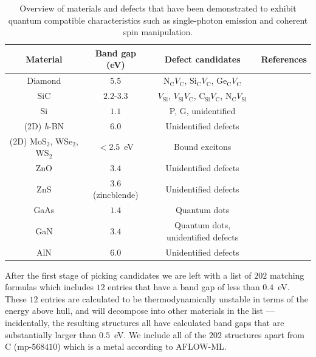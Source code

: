 \documentclass[superscriptaddress,unsortedaddress,
 amsmath,amssymb,
 aps,
]{revtex4-2}
\begin{document}
\begin{table}[b]
    \centering 
    \caption{Overview of materials and defects that have been demonstrated to exhibit quantum  compatible characteristics such as single-photon emission and coherent spin manipulation.}
    \begin{tabular}{c|c|c|c}
    Material & Band gap (eV) & Defect candidates & References \\
    \hline
    Diamond  & $5.5$  & N$_\mathrm{C}V_\mathrm{C}$, Si$_\mathrm{C}V_\mathrm{C}$, Ge$_\mathrm{C}V_\mathrm{C}$ & \cite{Taylor2008,Balasubramanian_2009,Barclay2011,Gordon2013,Rogers_2014,Bhaskar_2018} \\ 
    SiC & $2.2$-$3.3$ & $V_\mathrm{Si}$, $V_\mathrm{Si}V_\mathrm{C}$, C$_\mathrm{Si}V_\mathrm{C}$, N$_\mathrm{C}V_\mathrm{Si}$ & \cite{Widmann2014,Christle_2015,Castelletto_2014,Zargaleh_2018}  \cite{Weber2010, Son2020, Falk2013} \\ 
    Si & $1.1$ & P, G, unidentified & \cite{Muhonen_2014,Durand_2020,Redjem2020} \\ 
    (2D) \textit{h}-BN & $6.0$ & Unidentified defects & \cite{Tran_2016,Tran_2016b,Hayee_2020} \\ 
    (2D) MoS$_2$, WSe$_2$, WS$_2$ & $<2.5$~eV & Bound excitons & \cite{Toth2019} \\
    ZnO & $3.4$ & Unidentified defects & \cite{Morfa2012} \\ 
    ZnS & $3.6$ (zincblende) & Unidentified defects & \cite{Stewart2019} \\ 
    GaAs & $1.4$ & Quantum dots & \cite{Bluhm2010} \\ 
    GaN & $3.4$ & Quantum dots, unidentified defects & \cite{Roux2017,Berhane2018} \\
    AlN & $6.0$ & Unidentified defects & \cite{Xue2020}\\
    \end{tabular}
    \label{tab:qt-materials}
\end{table} 

After the first stage of picking candidates we are left with a list of $202$ matching formulas which includes $12$ entries that have a band gap of less than $0.4$~eV. These $12$ entries are calculated to be thermodynamically unstable in terms of the energy above hull, and will decompose into other materials in the list --- incidentally, the resulting structures all have calculated band gaps that are substantially larger than $0.5$~eV. We include all of the $202$ structures apart from C (mp-$568410$) which is a metal according to AFLOW-ML. 
 
\end{document}
